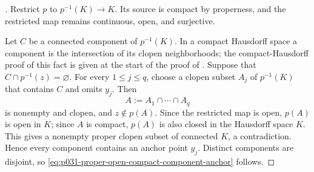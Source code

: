 \begin{proof}[]
Restrict $p$ to $p^{-1}(K)\to K$.  Its source is compact by properness,
and the restricted map remains continuous, open, and surjective.

Let $C$ be a connected component of $p^{-1}(K)$.  In a compact Hausdorff
space a component is the intersection of its clopen neighborhoods; the
compact-Hausdorff proof of this fact is given at the start of the proof of
.  Suppose that
$C\cap p^{-1}(z)=\varnothing$.  For every $1\leq j\leq q$, choose a
clopen subset $A_j$ of $p^{-1}(K)$ that contains $C$ and omits $y_j$.
Then
\[
                         A:=A_1\cap\cdots\cap A_q
\]
is nonempty and clopen, and $z\notin p(A)$.  Since the restricted map is
open, $p(A)$ is open in $K$; since $A$ is compact, $p(A)$ is also closed
in the Hausdorff space $K$.  This gives a nonempty proper clopen subset
of connected $K$, a contradiction.  Hence every component contains an
anchor point $y_j$.  Distinct components are disjoint, so
\eqref{eq:p031-proper-open-compact-component-anchor} follows.
\end{proof}

